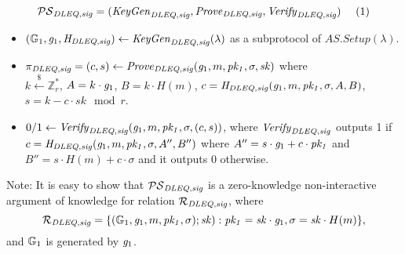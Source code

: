 \begin{construction}
\begin{comment}
and 
\end{comment}
$$ \PSsig = (\Gensig, \Provsig, \Verisig) \ \ \ \ (1)$$ 
\begin{itemize}
\item $(\mathbb{G}_{1}, \mathit{g}_{1}, \mathit{H}_{\mathit{DLEQ}, \mathit{sig}}) \leftarrow \mathit{KeyGen}_{\mathit{DLEQ}, \mathit{sig}}(\lambda)$ as a subprotocol of $\mathit{AS.Setup}(\lambda)$. 
\item $\pi_{\mathit{DLEQ}, \mathit{sig}} = (c,s) \leftarrow \mathit{Prove}_{\mathit{DLEQ}, \mathit{sig}}(\mathit{g}_{1}, m, \mathit{pk_1}, \sigma, \mathit{sk})$ where \\ $k \xleftarrow{\$} \mathbb{Z}_{r}^{*}$, $A =k \cdot \mathit{g}_{1}$, 
$B=k \cdot H(m)$, $c = \mathit{H}_{\mathit{DLEQ}, \mathit{sig}} (\mathit{g}_{1}, m, \mathit{pk_1}, \sigma, A, B)$, \\ $s = k - c \cdot \mathit{sk} \mod r$. 
\item $0/1 \leftarrow \mathit{Verify}_{\mathit{DLEQ}, \mathit{sig}}(\mathit{g}_{1}, m, \mathit{pk_1}, \sigma, (c,s))$, 
where $\mathit{Verify}_{\mathit{DLEQ}, \mathit{sig}}$ outputs 1 if  $c= \mathit{H}_{\mathit{DLEQ}, \mathit{sig}} (\mathit{g}_{1}, m, \mathit{pk_1}, \sigma, A'', B'')$
where $A'' = s \cdot \mathit{g}_{1} + c \cdot \mathit{pk_1}$ and $B'' = s \cdot H(m)  + c \cdot \sigma$ and it outputs $0$ otherwise.  
\end{itemize}
\end{construction}


\noindent Note: It is easy to show that $\mathcal{PS}_{\mathit{DLEQ}, \mathit{sig}}$ is a zero-knowledge non-interactive argument of knowledge for relation $\mathcal{R}_{\mathit{DLEQ},\mathit{sig}}$, where 
$$\mathcal{R}_{\mathit{DLEQ},\mathit{sig}} = \{( \mathbb{G}_{1}, \mathit{g}_{1}, m, \mathit{pk_1}, \sigma); \mathit{sk}) : \mathit{pk_1} = \mathit{sk} \cdot \mathit{g}_{1}, \sigma = \mathit{sk} \cdot H(m)\},$$
and $\mathbb{G}_{1}$ is generated by $\mathit{g}_{1}$. 


